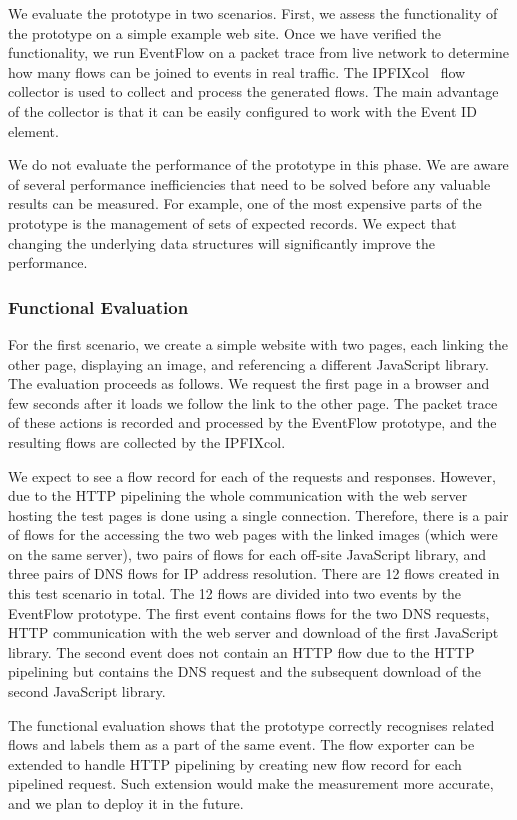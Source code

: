 We evaluate the prototype in two scenarios. First, we assess the functionality of the prototype on a simple example web site. Once we have verified the functionality, we run EventFlow on a packet trace from live network to determine how many flows can be joined to events in real traffic. The IPFIXcol~\cite{Velan-2012-Flow} flow collector is used to collect and process the generated flows. The main advantage of the collector is that it can be easily configured to work with the Event ID element.

We do not evaluate the performance of the prototype in this phase. We are aware of several performance inefficiencies that need to be solved before any valuable results can be measured. For example, one of the most expensive parts of the prototype is the management of sets of expected records. We expect that changing the underlying data structures will significantly improve the performance.

\subsubsection{Functional Evaluation}
For the first scenario, we create a simple website with two pages, each linking the other page, displaying an image, and referencing a different JavaScript library. The evaluation proceeds as follows. We request the first page in a browser and few seconds after it loads we follow the link to the other page. The packet trace of these actions is recorded and processed by the EventFlow prototype, and the resulting flows are collected by the IPFIXcol.

We expect to see a flow record for each of the requests and responses. However, due to the HTTP pipelining the whole communication with the web server hosting the test pages is done using a single connection. Therefore, there is a pair of flows for the accessing the two web pages with the linked images (which were on the same server), two pairs of flows for each off-site JavaScript library, and three pairs of DNS flows for IP address resolution. There are 12 flows created in this test scenario in total. The 12 flows are divided into two events by the EventFlow prototype. The first event contains flows for the two DNS requests, HTTP communication with the web server and download of the first JavaScript library. The second event does not contain an HTTP flow due to the HTTP pipelining but contains the DNS request and the subsequent download of the second JavaScript library.

The functional evaluation shows that the prototype correctly recognises related flows and labels them as a part of the same event. The flow exporter can be extended to handle HTTP pipelining by creating new flow record for each pipelined request. Such extension would make the measurement more accurate, and we plan to deploy it in the future.


